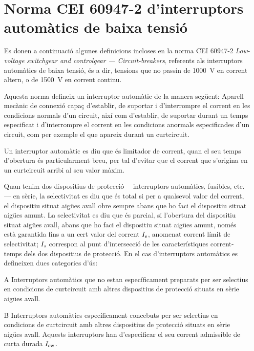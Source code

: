 \section{Norma CEI 60947-2  d'interruptors automàtics  de baixa tensió}


Es donen a continuació algunes definicions incloses en la norma CEI 60947-2 \textit{Low-voltage switchgear and controlgear --- Circuit-breakers}, referents als interruptors automàtics de baixa tensió, és a dir, tensions que no passin de \qty{1000}{V} en corrent altern, o de \qty{1500}{V} en corrent continu.

Aquesta norma defineix un interruptor automàtic de la manera següent: Aparell mecànic de connexió capaç d'establir, de suportar i d'interrompre el corrent en les condicions normals d'un circuit, així com d'establir, de suportar durant un temps especificat i  d'interrompre el corrent en les condicions anormals especificades d'un circuit, com per exemple el que apareix durant un curtcircuit.

Un interruptor automàtic es diu que és limitador de corrent, quan el seu temps d'obertura és particularment breu, per tal d'evitar que el corrent que s'origina en un curtcircuit arribi al seu valor màxim.

Quan tenim dos  dispositius de protecció ---interruptors automàtics, fusibles, etc.--- en sèrie, la selectivitat es diu que és total si per a qualsevol valor del corrent, el dispositiu situat aigües avall obre sempre abans que ho faci el dispositiu situat aigües amunt. La selectivitat es diu que és parcial, si l'obertura del dispositiu situat aigües avall, abans que ho faci el dispositiu situat aigües amunt, només està garantida fins a un cert valor del corrent $I_\mathrm{s}$, anomenat corrent límit de selectivitat; $I_\mathrm{s}$ correspon al punt d'intersecció de les característiques corrent-temps dels dos dispositius de protecció. En el cas d'interruptors automàtics es defineixen dues categories d'ús:
 \begin{list}{}
   {\setlength{\labelwidth}{10mm} \setlength{\leftmargin}{15mm} \setlength{\labelsep}{5mm}}
   \item[A] Interruptors automàtics que no estan específicament preparats per ser selectius en condicions de curtcircuit amb altres dispositius de protecció situats en sèrie  aigües avall.
   \item[B] Interruptors automàtics específicament concebuts per ser selectius en condicions de curtcircuit amb altres dispositius de protecció situats en sèrie  aigües avall. Aquests interruptors han d'especificar el seu corrent admissible de curta durada $I_\mathrm{cw}$.
\end{list}

